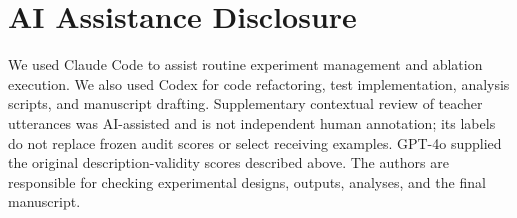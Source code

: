 
\section{AI Assistance Disclosure}
\label{app:ai_assistance}
We used Claude Code to assist routine experiment management and ablation
execution. We also used Codex for code refactoring, test implementation,
analysis scripts, and manuscript drafting. Supplementary contextual review
of teacher utterances was AI-assisted and is not independent human annotation;
its labels do not replace frozen audit scores or select receiving examples.
GPT-4o supplied the original description-validity scores described above.
The authors are responsible for checking experimental designs, outputs,
analyses, and the final manuscript.
